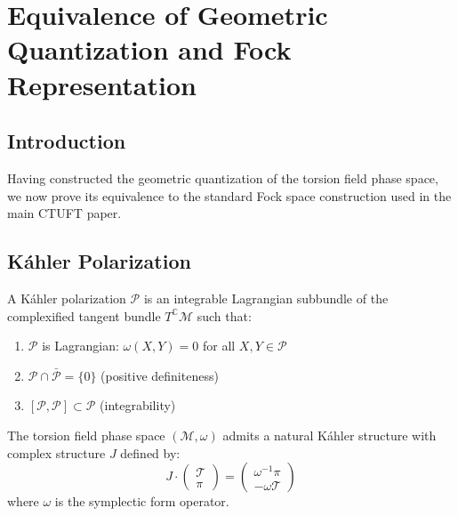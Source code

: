 \section{Equivalence of Geometric Quantization and Fock Representation}
\label{sec:fock_equivalence}

\subsection{Introduction}

Having constructed the geometric quantization of the torsion field phase space, we now prove its equivalence to the standard Fock space construction used in the main CTUFT paper.

\subsection{K\'{a}hler Polarization}

\begin{definition}
A K\'{a}hler polarization $\mathcal{P}$ is an integrable Lagrangian subbundle of the complexified tangent bundle $T^\mathbb{C}\mathcal{M}$ such that:
\begin{enumerate}
    \item $\mathcal{P}$ is Lagrangian: $\omega(X, Y) = 0$ for all $X, Y \in \mathcal{P}$
    \item $\mathcal{P} \cap \bar{\mathcal{P}} = \{0\}$ (positive definiteness)
    \item $[\mathcal{P}, \mathcal{P}] \subset \mathcal{P}$ (integrability)
\end{enumerate}
\end{definition}

\begin{theorem}
The torsion field phase space $(\mathcal{M}, \omega)$ admits a natural K\'{a}hler structure with complex structure $J$ defined by:
\begin{equation}
    J \cdot \begin{pmatrix} \mathcal{T} \\ \pi \end{pmatrix} = \begin{pmatrix} \omega^{-1} \pi \\ -\omega \mathcal{T} \end{pmatrix}
\end{equation}
where $\omega$ is the symplectic form operator.
\end{theorem}

